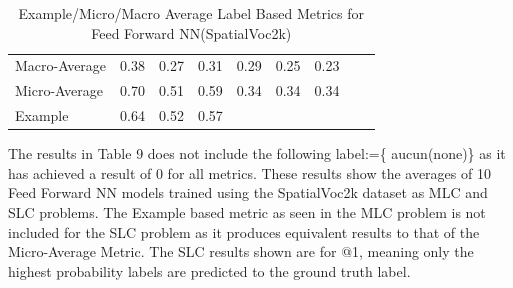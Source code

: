 \documentclass{csfyp}
\begin{document}
\begin{table}[!htbp]
\begin{tabular}{|l|l|l|l|l|l|l|l|l}
Macro-Average &	0.38	&	0.27	&	0.31	&	0.29	&	0.25	&	0.23\\ \cline{1-7}
Micro-Average &	0.70	&	0.51	&	0.59	&	0.34	&	0.34	&	0.34 \\ \cline{1-7}
Example       &	0.64	&	0.52	&	0.57 \\ \cline{1-4}
\end{tabular}
\caption{Example/Micro/Macro Average Label Based Metrics for Feed Forward NN(SpatialVoc2k)}
The results in Table 9 does not include the following label:=\{ aucun(none)\} as it has achieved a result of 0 for all metrics. These results show the averages of 10 Feed Forward NN models trained using the SpatialVoc2k dataset as MLC and SLC problems. The Example based metric as seen in the MLC problem is not included for the SLC problem as it produces equivalent results to that of the Micro-Average Metric. The SLC results shown are for @1, meaning only the highest probability labels are predicted to the ground truth label.
\vspace{-4mm}
\end{table}
\end{document}
